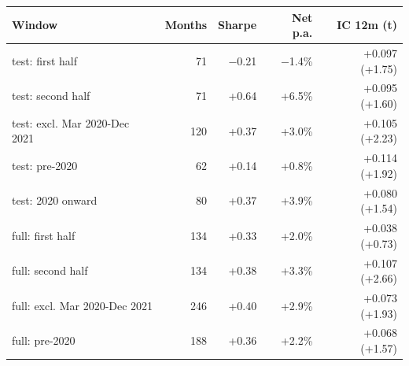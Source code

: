\begin{tabular}{lrrrr}
\toprule
Window & Months & Sharpe & Net p.a. & IC 12m (t) \\
\midrule
test: first half & 71 & $-$0.21 & $-$1.4\% & +0.097 (+1.75) \\
test: second half & 71 & +0.64 & +6.5\% & +0.095 (+1.60) \\
test: excl. Mar 2020-Dec 2021 & 120 & +0.37 & +3.0\% & +0.105 (+2.23) \\
test: pre-2020 & 62 & +0.14 & +0.8\% & +0.114 (+1.92) \\
test: 2020 onward & 80 & +0.37 & +3.9\% & +0.080 (+1.54) \\
full: first half & 134 & +0.33 & +2.0\% & +0.038 (+0.73) \\
full: second half & 134 & +0.38 & +3.3\% & +0.107 (+2.66) \\
full: excl. Mar 2020-Dec 2021 & 246 & +0.40 & +2.9\% & +0.073 (+1.93) \\
full: pre-2020 & 188 & +0.36 & +2.2\% & +0.068 (+1.57) \\
\bottomrule
\end{tabular}
